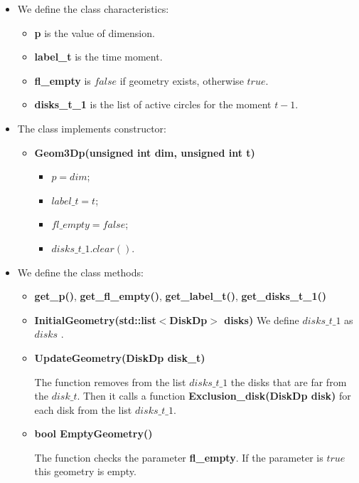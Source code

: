 \documentclass{report}
\begin{document}
\begin{itemize}
	\item We define the class characteristics: 
	\begin{itemize}
		\item {\bfseries p} is the value of dimension.
		
		\item {\bfseries label\_t} is the time moment.
		
		\item {\bfseries fl\_empty} is  $false$ if geometry exists, otherwise $true$.
		
		\item {\bfseries disks\_t\_1} is the list of active circles for the moment $t-1$.
	\end{itemize}
	
	\item The class implements constructor:
	\begin{itemize}
		\item {\bfseries Geom3Dp(unsigned  int dim, unsigned  int t)}
		\begin{itemize}
			\item $p = dim$;
			\item $label\_t = t$;
			\item $fl\_empty = false$;
			\item $disks\_t\_1.clear()$.
		\end{itemize}	
	\end{itemize}
	
	\item We define the class methods:
	
	\begin{itemize}
		\item  {\bfseries get\_p()}, {\bfseries get\_fl\_empty()}, {\bfseries get\_label\_t()}, {\bfseries get\_disks\_t\_1()}
		
		\item {\bfseries InitialGeometry(std::list$<$DiskDp$>$ disks)}  We define $disks\_t\_1$ as $disks$ .	
		
		\item {\bfseries UpdateGeometry(DiskDp disk\_t)} 
		
		The function removes from the list $disks\_t\_1$ the disks that are far from the  $disk\_t$.
		Then it calls a function {\bfseries  Exclusion\_disk(DiskDp disk)} for each disk from the list  $disks\_t\_1$.
		
		\item {\bfseries bool EmptyGeometry()}
		
		The function checks the parameter {\bfseries fl\_empty}. If the parameter is  $true$  this geometry is empty. 
	\end{itemize}
\end{itemize}
\end{document}
